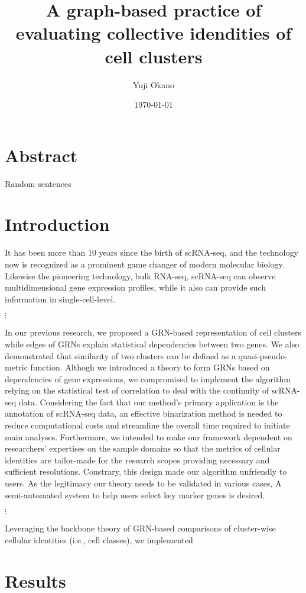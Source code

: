 \documentclass{article}
\title{
  A graph-based practice of evaluating collective idendities of cell clusters
}
\author[1,2]{Yuji Okano}
\affil[1]{
  Department of Extended Intelligence for Medicine, 
  The Ishii-Ishibashi Laboratory, 
  Keio University School of Medicine
}
\affil[2]{
  Division of CNS Regeneration and Drug Discovery,
  International Center for Brain Science, 
  Fujita Health University
}
\date{\today}
\begin{document}
\maketitle

\section*{Abstract}
Random sentences

\section*{Introduction}
It has been more than 10 years since the birth of \ac{scRNA-seq},
and the technology now is recognized as a prominent game changer
of modern molecular biology. Likewise the pioneering technology, bulk RNA-seq,
scRNA-seq can observe multidimensional gene expression profiles, while
it also can provide such information in single-cell-level.

$\vdots$

In our previous research, we proposed a \ac{GRN}-based
representation of cell clusters while edges of GRNs explain statistical
dependencies between two genes\cite{okano2023set}. We also demonstrated that similarity of
two clusters can be defined as a quasi-pseudo-metric function\cite{okano2023set}. Althogh we
introduced a theory to form GRNs based on dependencies of gene expressions, 
we compromised to implement the algorithm relying on the statistical test of 
correlation to deal with the continuity of scRNA-seq data. Considering the fact that 
our method's primary application is the annotation of scRNA-seq data, 
an effective binarization method is needed to reduce computational costs and 
streamline the overall time required to initiate main analyses. Furthermore, we 
intended to make our framework dependent on researchers' expertises on the 
sample domains so that the metrics of cellular identities are tailor-made for the 
research scopes providing necessary and sufficient resolutions. Constrary, this 
design made our algorithm unfriendly to users. As the legitimacy our theory 
needs to be validated in various cases, A semi-automated system to help users 
select key marker genes is desired.

$\vdots$

Leveraging the backbone theory of GRN-based comparisons of cluster-wise
cellular identities (i.e., cell classes), we implemented 

\section*{Results}
\end{document}
